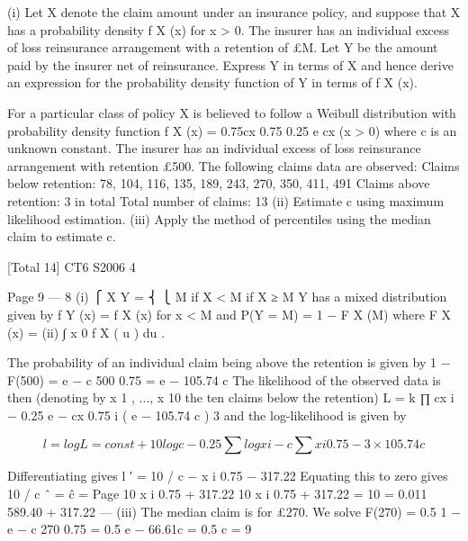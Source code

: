\documentclass[a4paper,12pt]{article}
\begin{document}
 


(i) Let X denote the claim amount under an insurance policy, and suppose that X
has a probability density f X (x) for x > 0. The insurer has an individual excess
of loss reinsurance arrangement with a retention of £M. Let Y be the amount
paid by the insurer net of reinsurance. Express Y in terms of X and hence
derive an expression for the probability density function of Y in terms of f X (x).


For a particular class of policy X is believed to follow a Weibull distribution with
probability density function
f X (x) = 0.75cx
0.75
0.25 e cx
(x > 0)
where c is an unknown constant. The insurer has an individual excess of loss
reinsurance arrangement with retention £500. The following claims data are
observed:
Claims below retention: 78, 104, 116, 135, 189, 243, 270, 350, 411, 491
Claims above retention: 3 in total
Total number of claims: 13
(ii) Estimate c using maximum likelihood estimation.
(iii) Apply the method of percentiles using the median claim to estimate c.

[Total 14]
CT6 S2006
4

Page 9 — %
8
(i)
⎧ X
Y = ⎨
⎩ M
if X < M
if X ≥ M
Y has a mixed distribution given by
f Y (x) = f X (x) for x < M and
P(Y = M) = 1 − F X (M)
where F X (x) =
(ii)
∫
x
0
f X ( u ) du .

The probability of an individual claim being above the retention is given by
1 − F(500) = e − c 500
0.75
= e − 105.74 \times  c
The likelihood of the observed data is then (denoting by x 1 , ..., x 10 the ten
claims below the retention)
L = k \times 
∏ cx i − 0.25 e − cx
0.75
i
\times  ( e − 105.74 c ) 3
and the log-likelihood is given by

\[l = log L = const + 10 log c − 0.25 \sum  log x i − c \sum  x i 0.75 − 3 \times  105.74 c\]

Differentiating gives
l ′ = 10 / c − \sum  x i 0.75 − 317.22
Equating this to zero gives
10 / c ˆ =
ĉ =
Page 10
\sum 
\sum  x i 0.75 + 317.22
10
x i 0.75
+ 317.22
=
10
= 0.011
589.40 + 317.22 — %
(iii)
The median claim is for £270. We solve
F(270) = 0.5
1 − e − c 270
0.75
= 0.5
e − 66.61c = 0.5
c =
9
\end{document}
